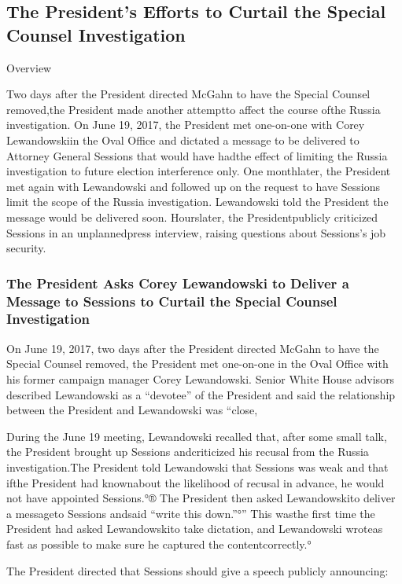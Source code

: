 {\subsection{The President's Efforts to Curtail the Special Counsel Investigation}

Overview

Two days after the President directed McGahn to have the Special Counsel removed,the President made another attemptto affect the course ofthe Russia investigation. On June 19, 2017, the President met one-on-one with Corey Lewandowskiin the Oval Office and dictated a message to be delivered to Attorney General Sessions that would have hadthe effect of limiting the Russia investigation to future election interference only. One monthlater, the President met again with Lewandowski and followed up on the request to have Sessions limit the scope of the Russia investigation. Lewandowski told the President the message would be delivered soon. Hourslater, the Presidentpublicly criticized Sessions in an unplannedpress interview, raising questions about Sessions’s job security.

\subsubsection{The President Asks Corey Lewandowski to Deliver a Message to Sessions to Curtail the Special Counsel Investigation}

On June 19, 2017, two days after the President directed McGahn to have the Special Counsel removed, the President met one-on-one in the Oval Office with his former campaign manager Corey Lewandowski. Senior White House advisors described Lewandowski as a “devotee” of the President and said the relationship between the President and Lewandowski was “close,

During the June 19 meeting, Lewandowski recalled that, after some small talk, the President brought up Sessions andcriticized his recusal from the Russia investigation.The President told Lewandowski that Sessions was weak and that ifthe President had knownabout the likelihood of recusal in advance, he would not have appointed Sessions.°® The President then asked Lewandowskito deliver a messageto Sessions andsaid “write this down.”°” This wasthe first time the President had asked Lewandowskito take dictation, and Lewandowski wroteas fast as possible to make sure he captured the contentcorrectly.°

The President directed that Sessions should give a speech publicly announcing:

}
